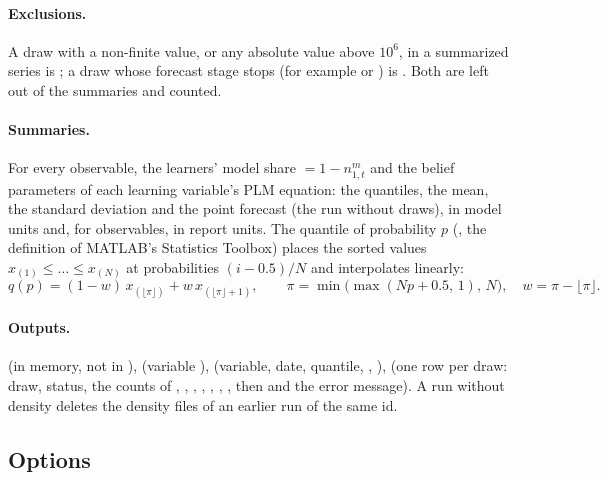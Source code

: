 \documentclass[11pt,a4paper]{article}
\begin{document}
\paragraph{Exclusions.} A draw with a non-finite value, or any absolute value above $10^6$, in a
summarized series is ; a draw whose forecast stage stops (for example
 or ) is . Both are left out of the
summaries and counted.

\paragraph{Summaries.} For every observable, the learners' model share 
$= 1 - n^m_{1,t}$ and the belief parameters of each learning variable's PLM equation: the quantiles,
the mean, the standard deviation and the point forecast (the run without draws), in model units and,
for observables, in report units. The quantile of probability $p$ (, the
definition of MATLAB's Statistics Toolbox) places the sorted values $x_{(1)}\le\dots\le x_{(N)}$ at
probabilities $(i - 0.5)/N$ and interpolates linearly:
\begin{equation}\label{eq:quantile}
  q(p) = (1-w)\,x_{(\lfloor\pi\rfloor)} + w\,x_{(\lfloor\pi\rfloor+1)},\qquad
  \pi = \min\bigl(\max(Np + 0.5,\,1),\,N\bigr),\quad w = \pi - \lfloor\pi\rfloor .
\end{equation}

\paragraph{Outputs.}  (in memory, not in ),
 (variable ),  (variable, date,
quantile, , ),  (one row per draw:
draw, status, the counts of , ,
, , , ,
, then  and the error message). A run without density deletes the
density files of an earlier run of the same id.

\subsection{Options}
\end{document}

